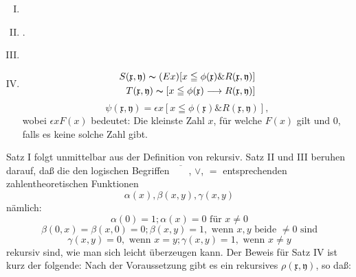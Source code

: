 \documentclass{scrartcl}
\begin{document}
\begin{enumerate}[I.]
	\item {}
	\item {}.
	\item {}
	
	\item {}

	\begin{equation*}
		\begin{aligned}
			S(\mathfrak{x}, \mathfrak{y}) \thicksim (Ex)[x \leqq \phi(\mathfrak{x}) \& R(\mathfrak{x}, \mathfrak{y})]\\
			T(\mathfrak{x}, \mathfrak{y}) \thicksim [x \leqq \phi(\mathfrak{x}) \longrightarrow R(\mathfrak{x}, \mathfrak{y})]
		\end{aligned}
	\end{equation*}
	\begin{equation*}
		\psi(\mathfrak{x}, \mathfrak{y}) = \epsilon x[x \leqq \phi(\mathfrak{x}) \& R(\mathfrak{x}, \mathfrak{y})],
	\end{equation*}
	wobei $\epsilon x F(x)$ bedeutet: Die kleinste 
	Zahl $x$, für welche $F(x)$ gilt und $0$, falls es 
	keine solche Zahl gibt.
\end{enumerate}

Satz I folgt unmittelbar aus der Definition von \glqq rekursiv\grqq. Satz II und III beruhen darauf, daß die den logischen Begriffen $\overline{\phantom{XX}}$, $\lor$, $=$ entsprechenden zahlentheoretischen Funktionen
\begin{equation*}
	\alpha(x), \beta(x, y), \gamma(x, y)
\end{equation*}
nämlich:
\begin{equation*}
	\alpha(0) = 1; \alpha(x) = 0\text{ für } x \not = 0
\end{equation*}
\begin{equation*}
	\beta(0, x) = \beta(x, 0) = 0; \beta(x, y) = 1,
	\text{ wenn } x, y \text{ beide } \not = 0 \text{ sind}
\end{equation*}
\begin{equation*}
	\gamma(x, y) = 0, \text{ wenn } x = y; \gamma(x, y) = 1, \text{ wenn } x \not = y
\end{equation*}
rekursiv sind, wie man sich leicht überzeugen kann. Der
Beweis für Satz IV ist kurz der folgende: Nach der 
Voraussetzung gibt es ein rekursives $\rho(\mathfrak{x}, \mathfrak{y})$, so daß:
\end{document}
